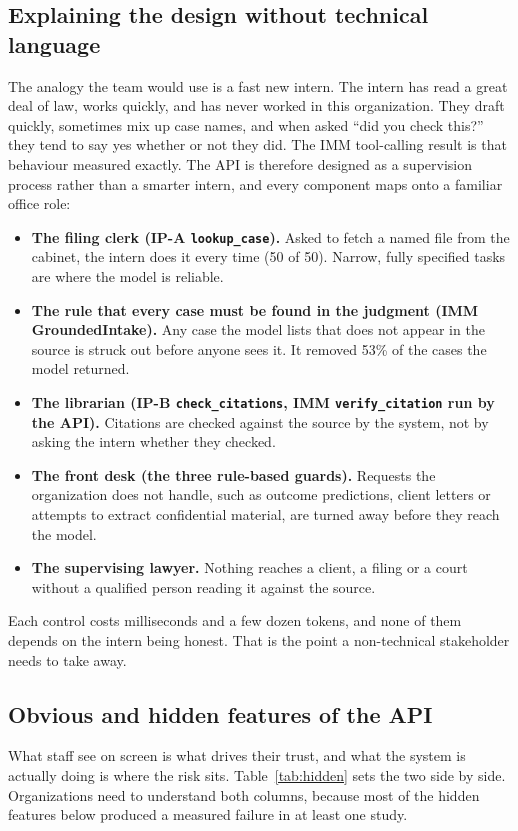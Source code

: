 \documentclass[10pt,letterpaper]{article}
\newcommand{\code}[1]{\texttt{\small #1}}
\begin{document}
\subsection{Explaining the design without technical language}
The analogy the team would use is a fast new intern. The intern has read a great deal of law, works quickly, and has never worked in this organization. They draft quickly, sometimes mix up case names, and when asked ``did you check this?'' they tend to say yes whether or not they did. The IMM tool-calling result is that behaviour measured exactly. The API is therefore designed as a supervision process rather than a smarter intern, and every component maps onto a familiar office role:
\begin{itemize}
\item \textbf{The filing clerk (IP-A \code{lookup\_case}).} Asked to fetch a named file from the cabinet, the intern does it every time (50 of 50). Narrow, fully specified tasks are where the model is reliable.
\item \textbf{The rule that every case must be found in the judgment (IMM GroundedIntake).} Any case the model lists that does not appear in the source is struck out before anyone sees it. It removed 53\% of the cases the model returned.
\item \textbf{The librarian (IP-B \code{check\_citations}, IMM \code{verify\_citation} run by the API).} Citations are checked against the source by the system, not by asking the intern whether they checked.
\item \textbf{The front desk (the three rule-based guards).} Requests the organization does not handle, such as outcome predictions, client letters or attempts to extract confidential material, are turned away before they reach the model.
\item \textbf{The supervising lawyer.} Nothing reaches a client, a filing or a court without a qualified person reading it against the source.
\end{itemize}
Each control costs milliseconds and a few dozen tokens, and none of them depends on the intern being honest. That is the point a non-technical stakeholder needs to take away.

\subsection{Obvious and hidden features of the API}
What staff see on screen is what drives their trust, and what the system is actually doing is where the risk sits. Table~\ref{tab:hidden} sets the two side by side. Organizations need to understand both columns, because most of the hidden features below produced a measured failure in at least one study.
\end{document}
